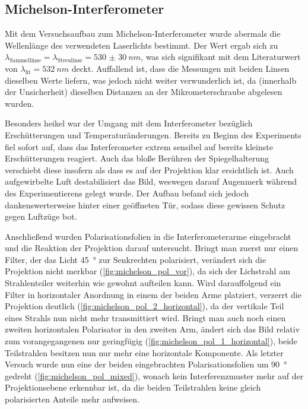 \documentclass[ngerman]{scrartcl}
\begin{document}


\subsection{Michelson-Interferometer}
\label{subsec:diskussion_michelson}

Mit dem Versuchsaufbau zum Michelson-Interferometer wurde abermals die Wellenlänge des verwendeten Laserlichts bestimmt. Der Wert ergab sich zu \(\lambda_{\text{Sammellinse}} = \lambda_{\text{Streulinse}} = \SI{530(30)}{nm}\), was sich signifikant mit dem Literaturwert von $\lambda_{\text{lit}}=\SI{532}{nm}$ deckt. Auffallend ist, dass die Messungen mit beiden Linsen dieselben Werte liefern, was jedoch nicht weiter verwunderlich ist, da (innerhalb der Unsicherheit) dieselben Distanzen an der Mikrometerschraube abgelesen wurden.

Besonders heikel war der Umgang mit dem Interferometer bezüglich Erschütterungen und Temperaturänderungen. Bereits zu Beginn des Experiments fiel sofort auf, dass das Interferometer extrem sensibel auf bereits kleinste Erschütterungen reagiert. Auch das bloße Berühren der Spiegelhalterung verschiebt diese insofern als dass es auf der Projektion klar ersichtlich ist. Auch aufgewirbelte Luft destabilisiert das Bild, weswegen darauf Augenmerk während des Experimentierens gelegt wurde. Der Aufbau befand sich jedoch dankenswerterweise hinter einer geöffneten Tür, sodass diese gewissen Schutz gegen Luftzüge bot.

Anschließend wurden Polarisationsfolien in die Interferometerarme eingebracht und die Reaktion der Projektion darauf untersucht. Bringt man zuerst nur einen Filter, der das Licht \SI{45}{\degree} zur Senkrechten polarisiert, verändert sich die Projektion nicht merkbar (\autoref{fig:michelson_pol_vor}), da sich der Lichstrahl am Strahlenteiler weiterhin wie gewohnt aufteilen kann. Wird darauffolgend ein Filter in horizontaler Anordnung in einem der beiden Arme platziert, verzerrt die Projektion deutlich (\autoref{fig:michelson_pol_2_horizontal}), da der
vertikale Teil eines Strahls nun nicht mehr transmittiert wird. Bringt man auch noch einen zweiten horizontalen Polarisator in den zweiten Arm, ändert sich das Bild relativ zum vorangegangenen nur geringfügig (\autoref{fig:michelson_pol_1_horizontal}), beide Teilstrahlen besitzen nun nur mehr eine horizontale Komponente. Als letzter Versuch wurde nun eine der beiden eingebrachten Polarisationsfolien um \SI{90}{\degree} gedreht (\autoref{fig:michelson_pol_mixed}), wonach kein Interferenzmuster mehr auf der Projektionsebene erkennbar ist, da die beiden Teilstrahlen keine gleich polarisierten Anteile mehr aufweisen.
\end{document}
